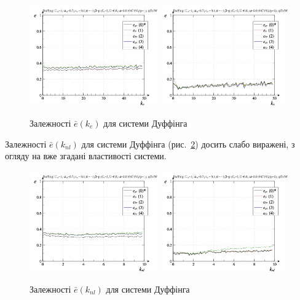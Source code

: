 \begin{figure}[ht!]
\begin{center}
  \includegraphics[width=0.49\textwidth]{p/cha/duff/duff_id-p_k_e_sign.png}
  \hfill
  \includegraphics[width=0.49\textwidth]{p/cha/duff/duff_id-p_k_e_sin.png}
\end{center}
\caption{Залежності $ \bar{e} (k_e) $ для системи Дуффінга}
\label{atu:f:duff_e_k_e}
\end{figure}

Залежності $ \bar{e} (k_{nl}) $ для системи Дуффінга (рис.~\ref{atu:f:duff_e_k_nl}) досить
слабо виражені, з огляду на вже згадані властивості системи.


\begin{figure}[ht!]
\begin{center}
  \includegraphics[width=0.49\textwidth]{p/cha/duff/duff_id-p_k_nl_sign.png}
  \hfill
  \includegraphics[width=0.49\textwidth]{p/cha/duff/duff_id-p_k_nl_sin.png}
\end{center}
\caption{Залежності $ \bar{e} (k_{nl}) $ для системи Дуффінга}
\label{atu:f:duff_e_k_nl}
\end{figure}

